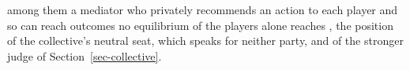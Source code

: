 among them a mediator who privately recommends an action to each player and
so can reach outcomes no equilibrium of the players alone reaches
\citep{aumann1974subjectivity}, the position of the collective's neutral seat,
which speaks for neither party, and of the stronger judge of
Section~\ref{sec-collective}.
